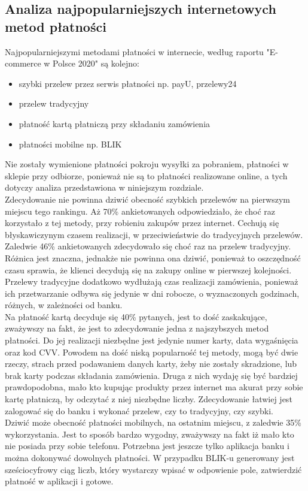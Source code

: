 \documentclass[12pt]{article}
\begin{document}
\begin{sloppypar}
{    \subsection{Analiza najpopularniejszych internetowych metod płatności}
  {
    Najpopularniejszymi metodami płatności w internecie, według raportu "E-commerce w Polsce 2020"\cite{gemius-report} są kolejno:
    \begin{itemize}
      \item szybki przelew przez serwis płatności np. payU, przelewy24
      \item przelew tradycyjny
      \item płatność kartą płatniczą przy składaniu zamówienia
      \item płatności mobilne np. BLIK
    \end{itemize}
    Nie zostały wymienione płatności pokroju wysyłki za pobraniem, płatności w sklepie przy odbiorze, ponieważ nie są to płatności realizowane online, 
    a tych dotyczy analiza przedstawiona w niniejszym rozdziale.\\
    Zdecydowanie nie powinna dziwić obecność szybkich przelewów na pierwszym miejscu tego rankingu. Aż 70\% ankietowanych odpowiedziało, 
    że choć raz korzystało z tej metody, przy robieniu zakupów przez internet. Cechują się błyskawiczynym czasem realizacji, w przeciwieństwie do tradycyjnych
    przelewów. Zaledwie 46\% ankietowanych zdecydowało się choć raz na przelew tradycyjny. Różnica jest znaczna, jednakże nie powinna ona dziwić, ponieważ 
    to oszczędność czasu sprawia, że klienci decydują się na zakupy online w pierwszej kolejności. Przelewy tradycyjne dodatkowo wydłużają czas realizacji 
    zamówienia, ponieważ ich przetwarzanie odbywa się jedynie w dni robocze, o wyznaczonych godzinach, różnych, w zależności od banku.\\
    Na płatność kartą decyduje się 40\% pytanych, jest to dość zaskakujące, zważywszy na fakt, że jest to zdecydowanie jedna z najszybszych metod płatności. 
    Do jej realizacji niezbędne jest jedynie numer karty, data wygaśnięcia oraz kod CVV. Powodem na dość niską popularność tej metody, mogą być dwie rzeczy, 
    strach przed podawaniem danych karty, żeby nie zostały skradzione, lub brak karty podczas składania zamówienia.
    Druga z nich wydaję się być bardziej prawdopodobna, mało kto kupując 
    produkty przez internet ma akurat przy sobie kartę płatniczą, by odczytać z niej niezbędne liczby. 
    Zdecydowanie łatwiej jest zalogować się do banku i wykonać przelew, czy to tradycyjny, czy szybki.\\
    Dziwić może obecność płatności mobilnych, na ostatnim miejscu, z zaledwie 35\% wykorzystania. 
    Jest to sposób bardzo wygodny, zważywszy na fakt iż mało kto nie posiada przy sobie telefonu. 
    Potrzebna jest jeszcze tylko aplikacja banku i można dokonywać dowolnych płatności. 
    W przypadku BLIK-u generowany jest sześciocyfrowy ciąg liczb, który wystarczy wpisać w odpowienie pole, zatwierdzić płatność w aplikacji i gotowe.
  }
}
\end{sloppypar}
\end{document}
